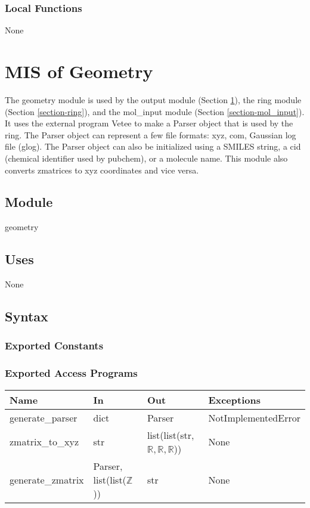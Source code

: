 \documentclass[12pt, titlepage]{article}
\begin{document}
\subsubsection{Local Functions}

None

\section{MIS of Geometry} \label{section-geometry}

The geometry module is used by the output module (Section 
\ref{section-geometry}), the ring module (Section \ref{section-ring}), and the 
mol\_input module (Section \ref{section-mol_input}). It uses the external 
program Vetee to make a Parser object that is used by the ring. The Parser 
object can represent a few file formats: xyz, com, Gaussian log file (glog). 
The Parser object can also be initialized using a SMILES string, a cid 
(chemical identifier used by pubchem), or a molecule name. This module also 
converts zmatrices to xyz coordinates and vice versa. 

\subsection{Module}

geometry

\subsection{Uses}

None

\subsection{Syntax}

\subsubsection{Exported Constants}

\subsubsection{Exported Access Programs}

\begin{center}
	\begin{tabular}{p{2cm} p{4cm} p{4cm} p{2cm}}
		\hline
		\textbf{Name} & \textbf{In} & \textbf{Out} & \textbf{Exceptions} \\
		\hline
		generate\_parser & dict & Parser & NotImplementedError \\
		zmatrix\_to\_xyz & str & list(list(str, $\mathbb{R}, \mathbb{R}, 
		\mathbb{R}$)) & None \\
		generate\_zmatrix & Parser, list(list($\mathbb{Z}$)) & str & None \\
		\hline
	\end{tabular}
\end{center}
\end{document}
